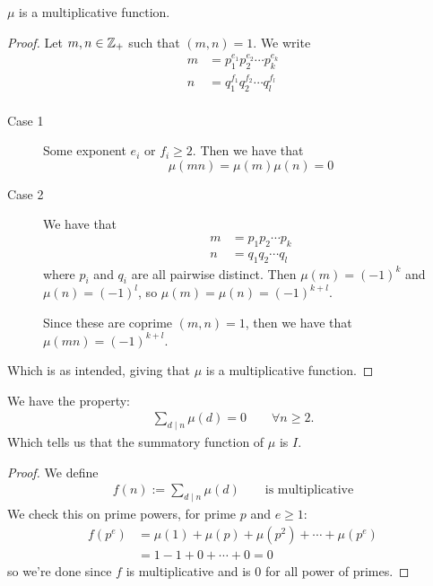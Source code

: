 \begin{lemma}
    $\mu$ is a multiplicative function.
\end{lemma}
\begin{proof}
    Let $m, n\in\mathbb Z_+$ such that $(m, n) = 1$. We write
    \begin{align*}
        m & = p_1^{e_1}p_2^{e_2}\cdots p_k^{e_k} \\
        n & = q_1^{f_1}q_2^{f_2}\cdots q_l^{f_l} \\
    \end{align*}
    \begin{description}
        \item[Case 1]
            Some exponent $e_i$ or $f_i \geq 2$. Then we have that \[\mu(mn) = \mu(m)\mu(n) = 0\]
        \item[Case 2]
            We have that \begin{align*}
                m & =p_1p_2\cdots p_k \\
                n & =q_1q_2\cdots q_l
            \end{align*}
            where $p_i$ and $q_i$ are all pairwise distinct. Then $\mu(m) = (-1)^k$ and $\mu(n) = (-1)^l$, so $\mu(m) = \mu(n) = (-1)^{k+l}$.

            Since these are coprime $(m, n) = 1$, then we have that $\mu(mn) = (-1)^{k+l}$.
    \end{description}
    Which is as intended, giving that $\mu$ is a multiplicative function.
\end{proof}

\begin{lemma}
    We have the property:
    \begin{align*}
        \sum_{d\mid n}\mu(d) = 0 \qquad \forall n\geq 2.
    \end{align*}
    Which tells us that the summatory function of $\mu$ is $I$.
\end{lemma}
\begin{proof}
    We define
    \begin{align*}
        f(n) := \sum_{d\mid n}\mu(d) \qquad \text{is multiplicative}
    \end{align*}
    We check this on prime powers, for prime $p$ and $e\geq 1$:
    \begin{align*}
        f(p^e) & = \mu(1) + \mu(p) + \mu(p^2) + \cdots + \mu(p^e) \\
               & = 1 - 1 + 0 + \cdots + 0 = 0
    \end{align*}
    so we're done since $f$ is multiplicative and is $0$ for all power of primes.
\end{proof}

